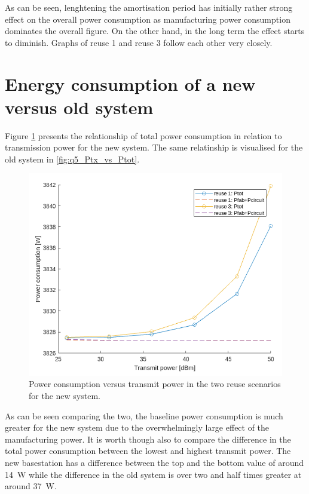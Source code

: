 \documentclass{article}
\begin{document}
As can be seen, lenghtening the amortisation period has initially rather strong effect on the overall power consumption as manufacturing power consumption dominates the overall figure. On the other hand, in the long term the effect starts to diminish. Graphs of reuse 1 and reuse 3 follow each other very closely.

\newpage
\section{Energy consumption of a new versus old system}

Figure \ref{fig:q9_Ptx_vs_Ptot_new} presents the relationship of total power consumption in relation to transmission power for the new system. The same relatinship is visualised for the old system in \ref{fig:q5_Ptx_vs_Ptot}.

\begin{figure}[!htb]
    \centering
    \includegraphics[width=12cm]{images/q9_Ptx_vs_Ptot_new.png}
    \caption{Power consumption versus transmit power in the two reuse scenarios for the new system.}
    \label{fig:q9_Ptx_vs_Ptot_new}
\end{figure}

As can be seen comparing the two, the baseline power consumption is much greater for the new system due to the overwhelmingly large effect of the manufacturing power. It is worth though also to compare the difference in the total power consumption between the lowest and highest transmit power. The new basestation has a difference between the top and the bottom value of around \SI{14}{W} while the difference in the old system is over two and half times greater at around \SI{37}{W}.
\end{document}
